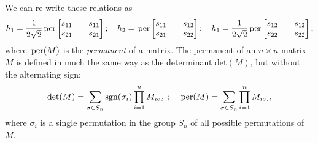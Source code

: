We can re-write these relations as
\begin{equation}
    h_1 = \frac{1}{2\sqrt{2}} \,\mathrm{per}
   \begin{bmatrix}
       s_{11} && s_{11}\\
       s_{21} && s_{21}
   \end{bmatrix} ;\quad
    h_2 =  \,\mathrm{per}  
   \begin{bmatrix}
       s_{11} && s_{12}\\
       s_{21} && s_{22}
   \end{bmatrix} ;\quad
    h_1 = \frac{1}{2\sqrt{2}} \,\mathrm{per}  
   \begin{bmatrix}
       s_{12} && s_{12}\\
       s_{22} && s_{22}
   \end{bmatrix},
   \label{eqn:two-photon-permanents}
\end{equation}
where $\,\mathrm{per}(M)$ is the \emph{permanent} of a matrix. The permanent of an $n\times n$ matrix $M$ is defined in much the same way as the determinant $\mathrm{det}(M)$, but without the alternating sign:
\begin{equation}
\det (M) = \sum_{\sigma \in S_n} \mathrm{sgn}(\sigma_i) \prod_{i=1}^n M_{i \sigma_i} ~;\quad
    \,\mathrm{per} (M) = \sum_{\sigma \in S_n} \prod_{i=1}^n M_{i \sigma_i}, 
\end{equation}
where $\sigma_i$ is a single permutation in the group $S_n$ of all possible permutations of $M$. 

